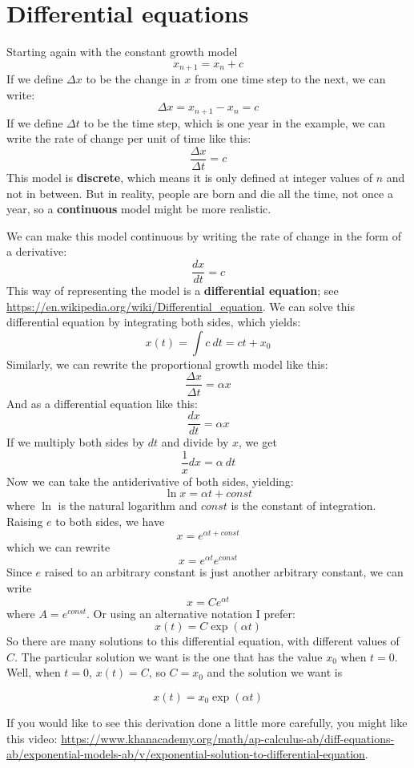 \documentclass[12pt]{book}
\theoremstyle{exercise}
\begin{document}
\section{Differential equations}

Starting again with the constant growth model
%
\[ x_{n+1} = x_n + c \]
%
If we define $\Delta x$ to be the change in $x$ from one time step to the next, we can write:
%
\[ \Delta x = x_{n+1} - x_n = c \]
%
If we define $\Delta t$ to be the time step, which is one year in the example, we can write the rate of change per unit of time like this:
%
\[ \frac{\Delta x}{\Delta t} = c \]
%
This model is {\bf discrete}, which means it is only defined at integer values of $n$ and not in between.  But in reality, people are born and die all the time, not once a year, so a {\bf continuous} model might be more realistic.

We can make this model continuous by writing the rate of change in the form of a derivative:
%
\[ \frac{dx}{dt} = c \]
%
This way of representing the model is a {\bf differential equation}; see \url{https://en.wikipedia.org/wiki/Differential_equation}.  We can solve this differential equation by integrating both sides, which yields:
%
\[ x(t) = \int c~dt = c t + x_0 \]
%
Similarly, we can rewrite the proportional growth model like this:
%
\[ \frac{\Delta x}{\Delta t} = \alpha x \]
%
And as a differential equation like this:
%
\[ \frac{dx}{dt} = \alpha x \]
%
If we multiply both sides by $dt$ and divide by $x$, we get
%
\[ \frac{1}{x} dx = \alpha~dt \] 
%
Now we can take the antiderivative of both sides, yielding:
%
\[ \ln x = \alpha t + const \]
%
where $\ln$ is the natural logarithm and $const$ is the constant of integration.  Raising $e$ to both sides, we have
%
\[ x = e^{\alpha t + const} \]
%
which we can rewrite
%
\[ x = e^{\alpha t} e^{const} \]
%
Since $e$ raised to an arbitrary constant is just another arbitrary constant, we can write
%
\[ x = Ce^{\alpha t} \]
%
where $A = e^{const}$.  Or using an alternative notation I prefer:
%
\[ x(t) = C \exp(\alpha t) \]
%
So there are many solutions to this differential equation, with different values of $C$.  The particular solution we want is the one that has the value $x_0$ when $t=0$.  Well, when $t=0$, $x(t) = C$, so $C = x_0$ and the solution we want is

\[ x(t) = x_0 \exp(\alpha t) \]

If you would like to see this derivation done a little more carefully, you might like this video: \url{https://www.khanacademy.org/math/ap-calculus-ab/diff-equations-ab/exponential-models-ab/v/exponential-solution-to-differential-equation}.
\end{document}
